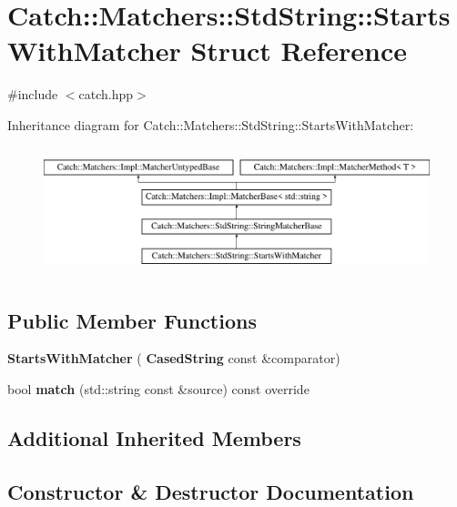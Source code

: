 \section{Catch\+::Matchers\+::Std\+String\+::Starts\+With\+Matcher Struct Reference}
\label{struct_catch_1_1_matchers_1_1_std_string_1_1_starts_with_matcher}


{\ttfamily \#include $<$catch.\+hpp$>$}

Inheritance diagram for Catch\+::Matchers\+::Std\+String\+::Starts\+With\+Matcher\+:\begin{figure}[H]
\begin{center}
\leavevmode
\includegraphics[height=3.758389cm]{struct_catch_1_1_matchers_1_1_std_string_1_1_starts_with_matcher}
\end{center}
\end{figure}
\subsection*{Public Member Functions}
\begin{DoxyCompactItemize}
\item 
\textbf{ Starts\+With\+Matcher} (\textbf{ Cased\+String} const \&comparator)
\item 
bool \textbf{ match} (std\+::string const \&source) const override
\end{DoxyCompactItemize}
\subsection*{Additional Inherited Members}


\subsection{Constructor \& Destructor Documentation}
\mbox{\label{struct_catch_1_1_matchers_1_1_std_string_1_1_starts_with_matcher_a7b86f258bdbd131a6e7bcd94a8977325}} 
